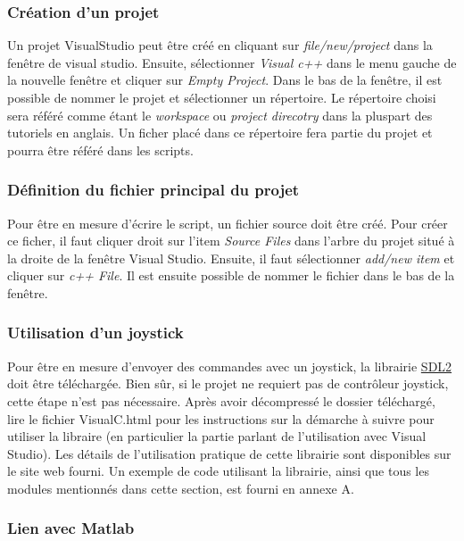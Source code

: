 \documentclass[root.tex]{subfiles}
\begin{document}
\subsubsection{Création d'un projet}
Un projet VisualStudio peut être créé en cliquant sur \textit{file/new/project} dans la fenêtre de visual studio.
Ensuite, sélectionner \textit{Visual c++} dans le menu gauche de la nouvelle fenêtre et cliquer sur \textit{Empty Project}.
Dans le bas de la fenêtre, il est possible de nommer le projet et sélectionner un répertoire.
Le répertoire choisi sera référé comme étant le \textit{workspace} ou \textit{project direcotry} dans la pluspart des tutoriels en anglais.
Un ficher placé dans ce répertoire fera partie du projet et pourra être référé dans les scripts.

\subsubsection{Définition du fichier principal du projet}
Pour être en mesure d'écrire le script, un fichier source doit être créé.
Pour créer ce ficher, il faut cliquer droit sur l'item \textit{Source Files} dans l'arbre du projet situé à la droite de la fenêtre Visual Studio.
Ensuite, il faut sélectionner \textit{add/new item} et cliquer sur \textit{c++ File}.
Il est ensuite possible de nommer le fichier dans le bas de la fenêtre.

\subsubsection{Utilisation d'un joystick}
Pour être en mesure d'envoyer des commandes avec un joystick, la librairie \href{https://www.libsdl.org/release/SDL2-2.0.7.zip
}{SDL2} doit être téléchargée.
Bien sûr, si le projet ne requiert pas de contrôleur joystick, cette étape n'est pas nécessaire.
Après avoir décompressé le dossier téléchargé, lire le fichier VisualC.html pour les instructions sur la démarche à suivre pour utiliser la libraire (en particulier la partie parlant de l'utilisation avec Visual Studio).
Les détails de l'utilisation pratique de cette librairie sont disponibles sur le site web fourni.
Un exemple de code utilisant la librairie, ainsi que tous les modules mentionnés dans cette section, est fourni en annexe A.

\subsubsection{Lien avec Matlab}
\end{document}
